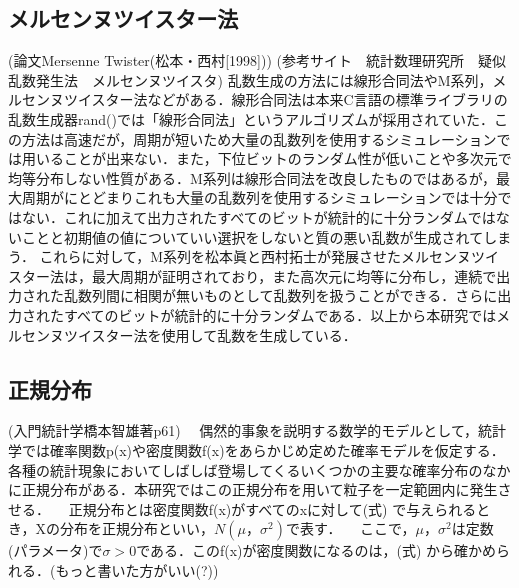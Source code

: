 \documentclass[11pt]{jreport}
\begin{document}
\subsection{メルセンヌツイスター法}
(論文Mersenne Twister(松本・西村[1998]))
(参考サイト　統計数理研究所　疑似乱数発生法　メルセンヌツイスタ)
乱数生成の方法には線形合同法やM系列，メルセンヌツイスター法などがある．線形合同法は本来C言語の標準ライブラリの乱数生成器rand()では「線形合同法」というアルゴリズムが採用されていた．この方法は高速だが，周期が短いため大量の乱数列を使用するシミュレーションでは用いることが出来ない．また，下位ビットのランダム性が低いことや多次元で均等分布しない性質がある．M系列は線形合同法を改良したものではあるが，最大周期がにとどまりこれも大量の乱数列を使用するシミュレーションでは十分ではない．これに加えて出力されたすべてのビットが統計的に十分ランダムではないことと初期値の値についていい選択をしないと質の悪い乱数が生成されてしまう．
これらに対して，M系列を松本眞と西村拓士が発展させたメルセンヌツイスター法は，最大周期が証明されており，また高次元に均等に分布し，連続で出力された乱数列間に相関が無いものとして乱数列を扱うことができる．さらに出力されたすべてのビットが統計的に十分ランダムである．以上から本研究ではメルセンヌツイスター法を使用して乱数を生成している．

\subsection{正規分布}
(入門統計学橋本智雄著p61)
　偶然的事象を説明する数学的モデルとして，統計学では確率関数p(x)や密度関数f(x)をあらかじめ定めた確率モデルを仮定する．各種の統計現象においてしばしば登場してくるいくつかの主要な確率分布のなかに正規分布がある．本研究ではこの正規分布を用いて粒子を一定範囲内に発生させる．
　正規分布とは密度関数f(x)がすべてのxに対して(式)
で与えられるとき，Xの分布を正規分布といい，$N(\mu，\sigma^{2})$で表す．
　ここで，$\mu，\sigma^{2}$は定数(パラメータ)で$\sigma>0$である．このf(x)が密度関数になるのは，(式)
から確かめられる．(もっと書いた方がいい(?))
\end{document}
